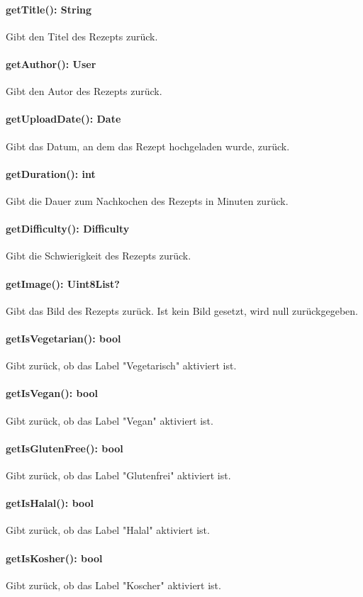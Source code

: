 \documentclass[parskip=full]{scrartcl}
\begin{document}
\paragraph{getTitle(): String}
Gibt den Titel des Rezepts zurück.
\paragraph{getAuthor(): User}
Gibt den Autor des Rezepts zurück.
\paragraph{getUploadDate(): Date}
Gibt das Datum, an dem das Rezept hochgeladen wurde, zurück.
\paragraph{getDuration(): int}
Gibt die Dauer zum Nachkochen des Rezepts in Minuten zurück.
\paragraph{getDifficulty(): Difficulty}
Gibt die Schwierigkeit des Rezepts zurück.
\paragraph{getImage(): Uint8List?}
Gibt das Bild des Rezepts zurück. Ist kein Bild gesetzt, wird null zurückgegeben.
\paragraph{getIsVegetarian(): bool}
Gibt zurück, ob das Label "Vegetarisch" aktiviert ist.
\paragraph{getIsVegan(): bool}
Gibt zurück, ob das Label "Vegan" aktiviert ist.
\paragraph{getIsGlutenFree(): bool}
Gibt zurück, ob das Label "Glutenfrei" aktiviert ist.
\paragraph{getIsHalal(): bool}
Gibt zurück, ob das Label "Halal" aktiviert ist.
\paragraph{getIsKosher(): bool}
Gibt zurück, ob das Label "Koscher" aktiviert ist.
\end{document}

